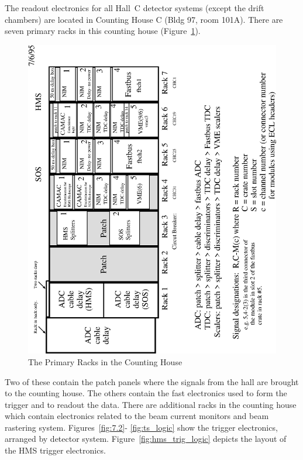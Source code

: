 The readout electronics for all Hall~C detector systems (except the
drift chambers) are located in Counting House C (Bldg 97, room 101A).
There are seven primary racks in this counting house (Figure~\ref{fig:7.1}). 
\begin{figure}
\includegraphics[width=6in]{racks}
\caption{The Primary Racks in the Counting House\label{fig:7.1}}
\end{figure}
Two of these
contain the patch panels where the signals from the hall are
brought to the counting
house. The others contain the fast electronics used to form the trigger and to
readout the data. There are additional racks in the counting house
which contain electronics
related to the beam current monitors and beam rastering system. Figures~\ref{fig:7.2}-
\ref{fig:ts_logic} show the trigger electronics, arranged by detector system. Figure~\ref{fig:hms_trig_logic} depicts
the layout of the HMS trigger electronics.

